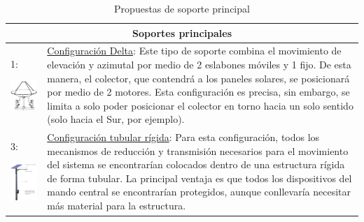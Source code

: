 \begin{table}[H]
	\centering
	\caption{Propuestas de soporte principal}
	\begin{tabular}{@{}|p{7cm}|p{7cm}|} 
		\hline
		\multicolumn{2}{|c|}{\textbf{Soportes principales}} \\
		\hline \hline
		1:
		\begin{center}
			\includegraphics[width=5cm]{imagenes/soporte1}
		\end{center}
		& 
		\underline{Configuración Delta}: Este tipo de soporte combina el movimiento de elevación y azimutal por medio de 2 eslabones móviles y 1 fijo. De esta manera, el colector, que contendrá a los paneles solares, se posicionará por medio de 2 motores. Esta configuración es precisa, sin embargo, se limita a solo poder posicionar el colector en torno hacia un solo sentido (solo hacia el Sur, por ejemplo).
		\\ \hline
		3:
		\begin{center}
			\includegraphics[width=4cm]{imagenes/soporte2}
		\end{center}
		&
		\underline{Configuración tubular rígida}: Para esta configuración, todos los mecanismos de reducción y transmisión necesarios para el movimiento del sistema se encontrarían colocados dentro de una estructura rígida de forma tubular. La principal ventaja es que todos los dispositivos del mando central se encontrarían protegidos, aunque conllevaría necesitar más material para la estructura.

\end{tabular}
\end{table}
